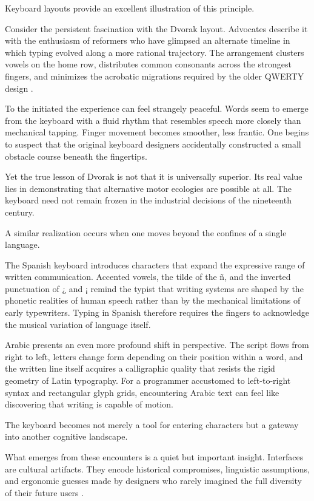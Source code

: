 \documentclass[12pt]{article}
\theoremstyle{definition}
\begin{document}
Keyboard layouts provide an excellent illustration of this principle.

Consider the persistent fascination with the Dvorak layout. Advocates
describe it with the enthusiasm of reformers who have glimpsed an
alternate timeline in which typing evolved along a more rational
trajectory. The arrangement clusters vowels on the home row, distributes
common consonants across the strongest fingers, and minimizes the
acrobatic migrations required by the older QWERTY design \cite{yamada1980}.

To the initiated the experience can feel strangely peaceful. Words seem
to emerge from the keyboard with a fluid rhythm that resembles speech
more closely than mechanical tapping. Finger movement becomes smoother,
less frantic. One begins to suspect that the original keyboard designers
accidentally constructed a small obstacle course beneath the fingertips.

Yet the true lesson of Dvorak is not that it is universally superior.
Its real value lies in demonstrating that alternative motor ecologies
are possible at all. The keyboard need not remain frozen in the
industrial decisions of the nineteenth century.

A similar realization occurs when one moves beyond the confines of a
single language.

The Spanish keyboard introduces characters that expand the expressive
range of written communication. Accented vowels, the tilde of the
\~n, and the inverted punctuation of ¿ and ¡ remind the typist that
writing systems are shaped by the phonetic realities of human speech
rather than by the mechanical limitations of early typewriters.
Typing in Spanish therefore requires the fingers to acknowledge the
musical variation of language itself.

Arabic presents an even more profound shift in perspective. The script
flows from right to left, letters change form depending on their
position within a word, and the written line itself acquires a
calligraphic quality that resists the rigid geometry of Latin typography.
For a programmer accustomed to left-to-right syntax and rectangular
glyph grids, encountering Arabic text can feel like discovering that
writing is capable of motion.

The keyboard becomes not merely a tool for entering characters but a
gateway into another cognitive landscape.

What emerges from these encounters is a quiet but important insight.
Interfaces are cultural artifacts. They encode historical compromises,
linguistic assumptions, and ergonomic guesses made by designers who
rarely imagined the full diversity of their future users \cite{norman1988}.
\end{document}
